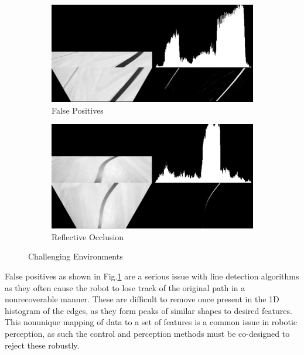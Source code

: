         \begin{figure}[H]
            \centering
            \begin{subfigure}[b]{0.45\textwidth}
                \includegraphics[width=\textwidth]{visionpipeline/vizFalsePos.png}
                \caption{False Positives}
                \label{fig:FalsePositives}
            \end{subfigure}
            \hfill
            \begin{subfigure}[b]{0.45\textwidth}
                \includegraphics[width=\textwidth]{visionpipeline/vizLightOclusion.png}
                \caption{Reflective Occlusion}
                \label{fig:ReflectOcclusion}
            \end{subfigure}
            \caption{Challenging Environments}
            \label{fig:ChallengingEnvironments}
        \end{figure}


        False positives as shown in Fig.\ref{fig:FalsePositives} are a serious issue with line detection algorithms as 
        they often cause the robot to lose track of the original path in a nonrecoverable manner.
        These are difficult to remove once present in the 1D histogram of the edges, as they form peaks of similar shapes to desired features. 
        This nonunique mapping of data to a set of features is a common issue in robotic perception, as such the control and perception methods 
        must be co-designed to reject these robustly.

